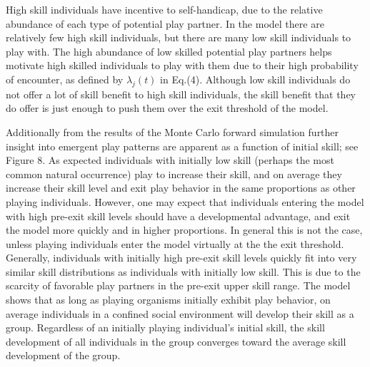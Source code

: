 \documentclass[12pt,letterpaper]{article}
\begin{document}
      High skill individuals have incentive to self-handicap, due to the relative abundance of each type of potential play partner.
      In the model there are relatively few high skill individuals, but there are many low skill individuals to play with.
      The high abundance of low skilled potential play partners helps motivate high skilled individuals to play with them due to their high probability of encounter, as defined by $\lambda_j(t)$ in Eq.(4).  
      Although low skill individuals do not offer a lot of skill benefit to high skill individuals, the skill benefit that they do offer is just enough to push them over the exit threshold of the model.
   
      Additionally from the results of the Monte Carlo forward simulation further insight into emergent play patterns are apparent as a function of initial skill; see Figure 8. %
      As expected individuals with initially low skill (perhaps the most common natural occurrence) play to increase their skill, and on average they increase their skill level and exit play behavior in the same proportions as other playing individuals.      
      However, one may expect that individuals entering the model with high pre-exit skill levels should have a developmental advantage, and exit the model more quickly and in higher proportions. 
      In general this is not the case, unless playing individuals enter the model virtually at the the exit threshold.
      Generally, individuals with initially high pre-exit skill levels quickly fit into very similar skill distributions as individuals with initially low skill.
      This is due to the scarcity of favorable play partners in the pre-exit upper skill range. %
      The model shows that as long as playing organisms initially exhibit play behavior, on average individuals in a confined social environment will develop their skill as a group.
      Regardless of an initially playing individual's initial skill, the skill development of all individuals in the group converges toward the average skill development of the group. 
\end{document}
